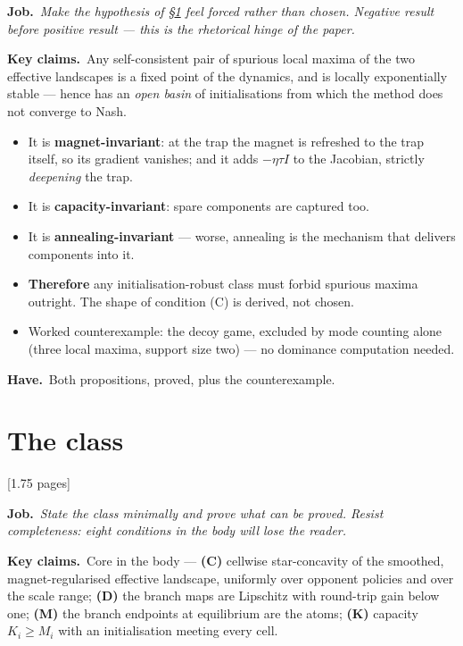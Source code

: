 \documentclass[11pt]{article}
\newcommand{\job}[1]{\par\smallskip\noindent
  \textcolor{jobc}{\textbf{Job.}}\ \emph{#1}\par\smallskip}
\newcommand{\says}[1]{\par\noindent\textbf{Key claims.}\ #1\par\smallskip}
\newcommand{\have}[1]{\par\noindent
  \textcolor{havec}{\textbf{Have.}}\ #1\par}
\newcommand{\budget}[1]{\hfill{\small\textsf{[#1]}}}
\theoremstyle{definition}
\theoremstyle{remark}
\begin{document}
\job{Make the hypothesis of \S\ref{sec:class} feel \emph{forced} rather than
chosen. Negative result before positive result --- this is the rhetorical hinge of
the paper.}

\says{Any self-consistent pair of spurious local maxima of the two effective
landscapes is a fixed point of the dynamics, and is locally exponentially stable
--- hence has an \emph{open basin} of initialisations from which the method does
not converge to Nash.}

\begin{itemize}[leftmargin=1.2em]
\item It is \textbf{magnet-invariant}: at the trap the magnet is refreshed to the
  trap itself, so its gradient vanishes; and it adds $-\eta\tau I$ to the
  Jacobian, strictly \emph{deepening} the trap.
\item It is \textbf{capacity-invariant}: spare components are captured too.
\item It is \textbf{annealing-invariant} --- worse, annealing is the mechanism
  that delivers components into it.
\item \textbf{Therefore} any initialisation-robust class must forbid spurious
  maxima outright. The shape of condition (C) is derived, not chosen.
\item Worked counterexample: the decoy game, excluded by mode counting alone
  (three local maxima, support size two) --- no dominance computation needed.
\end{itemize}

\have{Both propositions, proved, plus the counterexample.}

\section{The class}\label{sec:class}
\budget{1.75 pages}

\job{State the class minimally and prove what can be proved. Resist completeness:
eight conditions in the body will lose the reader.}

\says{Core in the body --- \textbf{(C)} cellwise star-concavity of the smoothed,
magnet-regularised effective landscape, uniformly over opponent policies and over
the scale range; \textbf{(D)} the branch maps are Lipschitz with round-trip gain
below one; \textbf{(M)} the branch endpoints at equilibrium are the atoms;
\textbf{(K)} capacity $K_i \ge M_i$ with an initialisation meeting every cell.}
\end{document}
